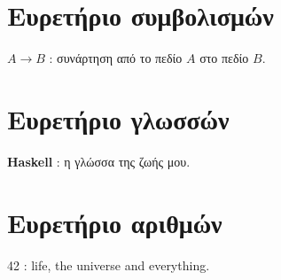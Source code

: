 \documentclass[diploma]{softlab-thesis}
\begin{document}






\backmatter

\appendix

\chapter{Ευρετήριο συμβολισμών}

$A \rightarrow B$ : συνάρτηση από το πεδίο $A$ στο πεδίο $B$.

\chapter{Ευρετήριο γλωσσών}

\textbf{Haskell} : η γλώσσα της ζωής μου.

\chapter{Ευρετήριο αριθμών}

42 : life, the universe and everything.


\end{document}
